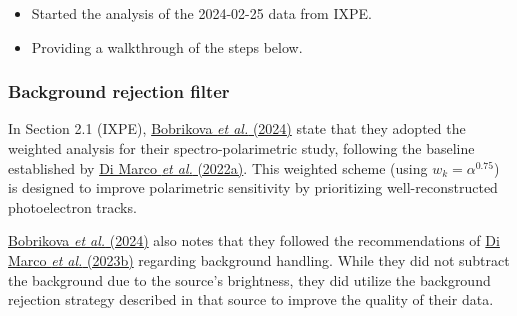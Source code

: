 	\begin{itemize}
		\item Started the analysis of the 2024-02-25 data from IXPE.
		
		\item Providing a walkthrough of the steps below.
	\end{itemize}
	
	\subsubsection*{Background rejection filter}
		In Section 2.1 (IXPE), \href{https://www.aanda.org/articles/aa/pdf/2024/08/aa50207-24.pdf}{Bobrikova \textit{et al.} (2024)} state that they adopted the weighted analysis for their spectro-polarimetric study, following the baseline established by \href{https://iopscience.iop.org/article/10.3847/1538-3881/ac51c9/pdf}{Di Marco \textit{et al.} (2022a)}. This weighted scheme (using $w_k=\alpha^{0.75}$) is designed to improve polarimetric sensitivity by prioritizing well-reconstructed photoelectron tracks.
		
		\href{https://www.aanda.org/articles/aa/pdf/2024/08/aa50207-24.pdf}{Bobrikova \textit{et al.} (2024)} also notes that they followed the recommendations of \href{https://iopscience.iop.org/article/10.3847/1538-3881/acba0f/pdf}{Di Marco \textit{et al.} (2023b)} regarding background handling. While they did not subtract the background due to the source's brightness, they did utilize the background rejection strategy described in that source to improve the quality of their data.
		
